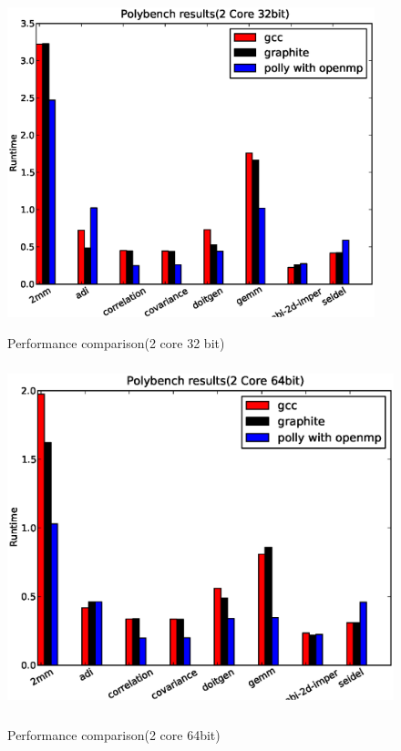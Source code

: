 \begin{figure}
\begin{center}
  \label{fig:2core1}
  \includegraphics[height=9cm]{images/2core32bit.eps}
  \caption{Performance comparison(2 core 32 bit)}
\end{center}
\end{figure}

\begin{figure}
\begin{center}
  \label{fig:2core2}
  \includegraphics[height=10cm]{images/2core64bit.eps}
  \caption{Performance comparison(2 core 64bit)}
\end{center}
\end{figure}

